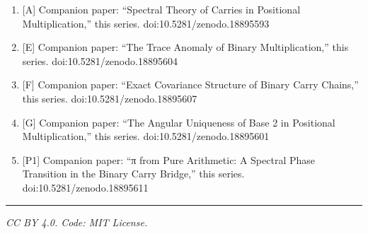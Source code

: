 \documentclass[
  11pt,
]{article}
\begin{document}
\begin{enumerate}
  two-matrix ensemble of real asymmetric matrices,'' \emph{J. Phys. A: Math.
  Theor.} 43, 085211, 2010.
\item
  {[}A{]} Companion paper: ``Spectral Theory of Carries in Positional
  Multiplication,'' this series. doi:10.5281/zenodo.18895593
\item
  {[}E{]} Companion paper: ``The Trace Anomaly of Binary Multiplication,'' this
  series. doi:10.5281/zenodo.18895604
\item
  {[}F{]} Companion paper: ``Exact Covariance Structure of Binary Carry
  Chains,'' this series. doi:10.5281/zenodo.18895607
\item
  {[}G{]} Companion paper: ``The Angular Uniqueness of Base 2 in Positional
  Multiplication,'' this series. doi:10.5281/zenodo.18895601
\item
  {[}P1{]} Companion paper: ``π from Pure Arithmetic: A Spectral Phase
  Transition in the Binary Carry Bridge,'' this series.
  doi:10.5281/zenodo.18895611
\end{enumerate}

\begin{center}\rule{0.5\linewidth}{0.5pt}\end{center}

\emph{CC BY 4.0. Code: MIT License.}
\end{document}
